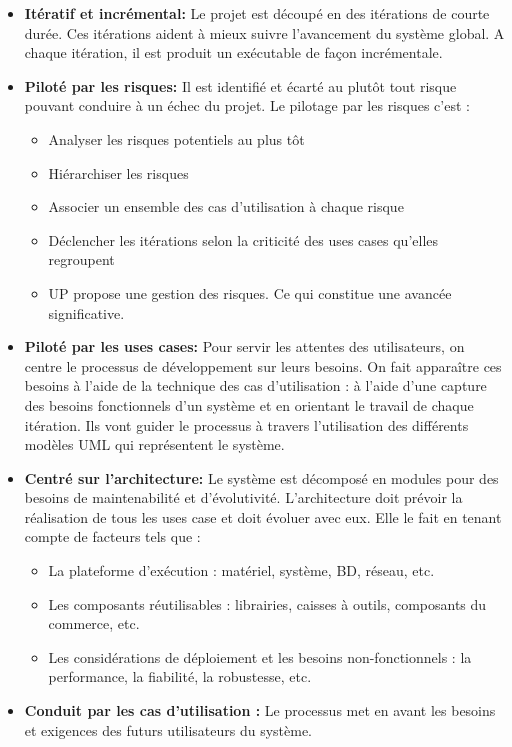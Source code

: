\documentclass[11pt,a4paper,oneside]{book}
\begin{document}
	\begin{itemize}
		\item \textbf{Itératif et incrémental:}
		Le projet est découpé en des itérations de courte durée. Ces itérations aident à mieux suivre l'avancement du système global. A chaque itération, il est produit un exécutable de façon incrémentale.
		\item \textbf{Piloté par les risques:}  Il est identifié et écarté au plutôt tout risque pouvant conduire à un échec du projet. Le pilotage par les risques c’est :
		\begin{itemize}
			\item Analyser les risques potentiels au plus tôt
			\item Hiérarchiser les risques
			\item Associer un ensemble des cas d'utilisation à chaque risque
			\item Déclencher les itérations selon la criticité des uses cases qu’elles regroupent 
			\item UP propose une gestion des risques. Ce qui constitue une avancée significative.
		\end{itemize}
		\item\textbf{Piloté par les uses cases:}
		Pour servir les attentes des utilisateurs, on centre le processus de développement sur leurs besoins. On fait apparaître ces besoins à l’aide de la technique des cas d’utilisation : à l’aide d’une capture des besoins fonctionnels d’un système et en orientant le travail de chaque itération. Ils vont guider le processus à travers l’utilisation des différents modèles UML qui représentent le système.
		\item\textbf{Centré sur l'architecture:}
		Le système est décomposé en modules pour des besoins de maintenabilité et d'évolutivité.
		L’architecture doit prévoir la réalisation de tous les uses case et doit évoluer avec eux. Elle le fait en tenant compte de facteurs tels que :
		\begin{itemize}
			\item La plateforme d’exécution : matériel, système, BD, réseau, etc.
			\item Les composants réutilisables : librairies, caisses à outils, composants du commerce, etc.
			\item Les considérations de déploiement et les besoins non-fonctionnels : la performance, la fiabilité, la robustesse, etc.
		\end{itemize}
		\item\textbf{Conduit par les cas d'utilisation :} Le processus met en avant les besoins et exigences des futurs utilisateurs du système.
	\end{itemize}
\end{document}
